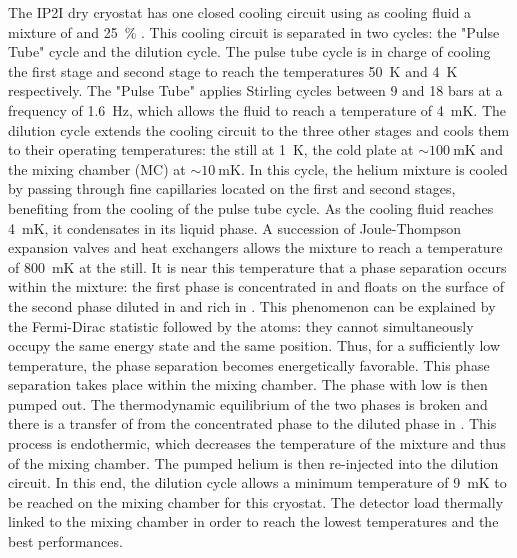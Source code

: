 The IP2I dry cryostat has one closed cooling circuit using as cooling fluid a mixture of  and \SI{25}{\percent} . This cooling circuit is separated in two cycles: the "Pulse Tube" cycle and the dilution cycle. 
The pulse tube cycle is in charge of cooling the first stage and second stage to reach the temperatures \SI{50}{\kelvin} and \SI{4}{\kelvin} respectively. The "Pulse Tube" applies Stirling cycles between 9 and 18 bars at a frequency of \SI{1.6}{\Hz}, which allows the  fluid to reach a temperature of \SI{4}{\milli\kelvin}.
The dilution cycle extends the cooling circuit to the three other stages and cools them to their operating temperatures: the still at \SI{1}{\kelvin}, the cold plate at $\sim \SI{100}{\milli\kelvin}$ and the mixing chamber (MC) at $\sim \SI{10}{\milli\kelvin}$. In this cycle, the helium mixture is cooled by passing through fine capillaries located on the first and second stages, benefiting from the cooling of the pulse tube cycle. As the cooling fluid reaches \SI{4}{\milli\kelvin}, it condensates in its liquid phase. A succession of Joule-Thompson expansion valves and heat exchangers allows the mixture to reach a temperature of \SI{800}{\milli\kelvin} at the still. It is near this temperature that a phase separation occurs within the mixture: the first phase is concentrated in  and floats on the surface of the second phase diluted in  and rich in . This phenomenon can be explained by the Fermi-Dirac statistic followed by the  atoms: they cannot simultaneously occupy the same energy state and the same position. Thus, for a sufficiently low temperature, the phase separation becomes energetically favorable. This phase separation takes place within the mixing chamber. The phase with low  is then pumped out. The thermodynamic equilibrium of the two phases is broken and there is a transfer of  from the concentrated phase to the diluted phase in . This process is endothermic, which decreases the temperature of the mixture and thus of the mixing chamber. The pumped helium  is then re-injected into the dilution circuit. In this end, the dilution cycle allows a minimum temperature of \SI{9}{\milli\kelvin} to be reached on the mixing chamber for this cryostat. The detector load thermally linked to the mixing chamber in order to reach the lowest temperatures and the best performances.

